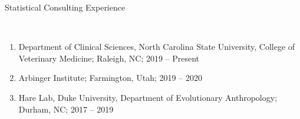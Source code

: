 \documentclass[11pt]{article}
\newcommand{\head}[1]{ %
    \bigskip %
    \begin{large}\begin{bf}{#1}\end{bf}\end{large} %

    \ \\ [-1.3cm] %

    \hrulefill}
\begin{document}
\head{Statistical Consulting Experience}

\begin{enumerate}[label=$\bullet$]

\item Department of Clinical Sciences, North Carolina State University, College of Veterinary Medicine; Raleigh, NC; 2019 -- Present

\item Arbinger Institute; Farmington, Utah; 2019 -- 2020


\item Hare Lab, Duke University, Department of Evolutionary Anthropology; Durham, NC; 2017 -- 2019

\end{enumerate}
\end{document}

